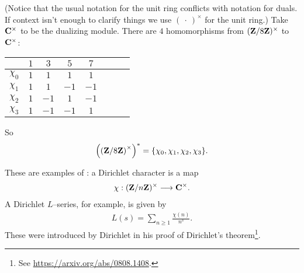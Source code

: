 \documentclass[11pt, oneside,margin=1in]{article}
\begin{document}
\begin{example}\label{}
	(Notice that the usual notation for the unit ring conflicts with notation for duals. If context isn't enough to clarify things we use $(\ \cdot\ )^\times$ for the unit ring.) Take $\mathbf C^\times$ to be the dualizing module. There are $4$ homomorphisms from $(\mathbf Z / 8\mathbf Z) ^\times$ to $\mathbf C^\times$:
	\begin{center}
\begin{tabular}{cccccccc}
    & $1$ & $3$ & $5$ & $7$\\
    \midrule
	$\chi_0$ & $1$ & $1$ & $1$ & $1$\\
	$\chi_1$ & $1$ & $1$ & $-1$ & $-1$\\
$\chi_2$ & $1$ & $-1$ & $1$ & $-1$\\
$\chi_3$ & $1$ & $-1$ & $-1$ & $1$\\

\end{tabular}
\end{center}
So
\begin{align*}
	\left( \left( \mathbf Z / 8\mathbf Z \right) ^\times \right) ^* = \{\chi_0,\chi_1,\chi_2,\chi_3\}.
\end{align*}
\end{example}

These are examples of : a Dirichlet character is a map
 \begin{align*}
	\chi : (\mathbf Z / n\mathbf Z) ^\times \longrightarrow \mathbf C^\times.
\end{align*}
A Dirichlet $L$--series, for example, is given by
\begin{align*}
	L(s)=\sum_{n\ge 1} \frac{\chi(n)}{n^s}.
\end{align*}
These were introduced by Dirichlet in his proof of Dirichlet's theorem\footnote{See \url{https://arxiv.org/abs/0808.1408}.}.
\end{document}
